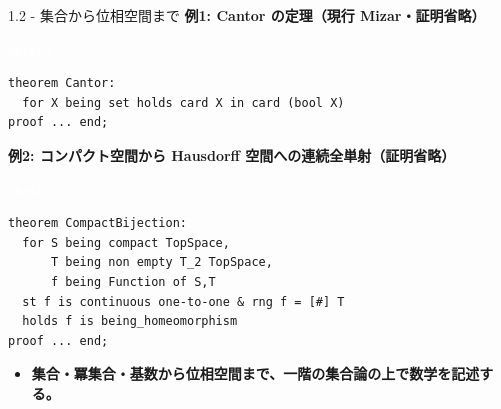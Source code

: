 \documentclass[dvipdfmx,aspectratio=169,11pt]{beamer}
\newcommand{\statusbadge}[2]{\colorbox{#1}{\textcolor{white}{\strut\scriptsize\sffamily\bfseries #2}}}
\newcommand{\badgeSketch}{\statusbadge{orange!75!black}{sketch}}
\begin{document}
\begin{frame}[fragile,t]{1.2 - 集合から位相空間まで}
\smallskip
\textbf{例1: Cantor の定理（現行 Mizar・証明省略）}~\badgeSketch
\begin{lstlisting}[language={mizar},basicstyle=\ttfamily\small]
theorem Cantor:
  for X being set holds card X in card (bool X)
proof ... end;
\end{lstlisting}
\smallskip
\textbf{例2: コンパクト空間から Hausdorff 空間への連続全単射（証明省略）}~\badgeSketch
\begin{lstlisting}[language={mizar},basicstyle=\ttfamily\small]
theorem CompactBijection:
  for S being compact TopSpace,
      T being non empty T_2 TopSpace,
      f being Function of S,T
  st f is continuous one-to-one & rng f = [#] T
  holds f is being_homeomorphism
proof ... end;
\end{lstlisting}
\begin{itemize}
\setlength{\itemsep}{1pt}
\setlength{\parsep}{0pt}
\setlength{\parskip}{0pt}
\item \textcolor{blue!55!black}{\textbf{集合・冪集合・基数から位相空間まで、一階の集合論の上で数学を記述する。}}
\end{itemize}
\end{frame}
\end{document}
